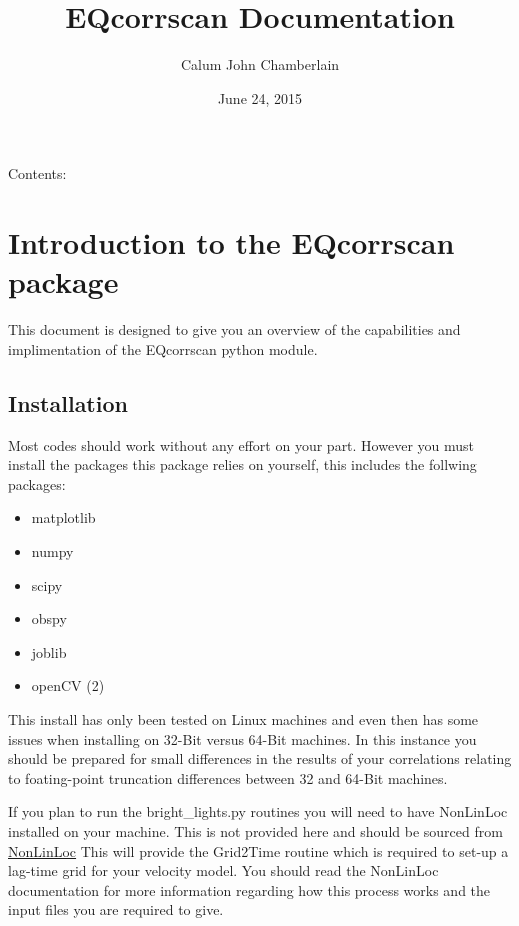 \documentclass[a4paper,10pt,english]{sphinxmanual}
\title{EQcorrscan Documentation}
\date{June 24, 2015}
\author{Calum John Chamberlain}
\begin{document}
\maketitle
\tableofcontents
{}\label{index::doc}


Contents:


\chapter{Introduction to the EQcorrscan package}
\label{intro::doc}\label{intro:introduction-to-the-eqcorrscan-package}\label{intro:welcome-to-eqcorrscan-s-documentation}
This document is designed to give you an overview of the capabilities and
implimentation of the EQcorrscan python module.


\section{Installation}
\label{intro:installation}
Most codes should work without any effort on your part.  However you must
install the packages this package relies on yourself, this includes the follwing
packages:
\begin{itemize}
\item {} 
matplotlib

\item {} 
numpy

\item {} 
scipy

\item {} 
obspy

\item {} 
joblib

\item {} 
openCV (2)

\end{itemize}

This install has only been tested on Linux machines and even then has some
issues when installing on 32-Bit versus 64-Bit machines.  In this instance you
should be prepared for small differences in the results of your correlations
relating to foating-point truncation differences between 32 and 64-Bit
machines.

If you plan to run the bright\_lights.py routines you will need to have
NonLinLoc installed on your machine.  This is not provided here and should
be sourced from \href{http://alomax.free.fr/nlloc/}{NonLinLoc} This will provide
the Grid2Time routine which is required to set-up a lag-time grid for your
velocity model.  You should read the NonLinLoc documentation for more
information regarding how this process works and the input files you are
required to give.
\end{document}
